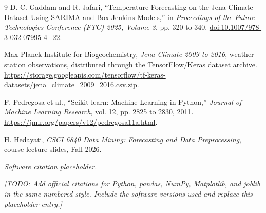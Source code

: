 \documentclass[11pt]{article}
\newcommand{\todo}[1]{\par\smallskip\noindent
  {\color{blue!60!black}\textit{[TODO: #1]}}\par\smallskip}
\begin{document}
\clearpage
\begin{thebibliography}{9}
D. C. Gaddam and R. Jafari,
``Temperature Forecasting on the Jena Climate Dataset Using SARIMA and
Box-Jenkins Models,'' in \textit{Proceedings of the Future Technologies
Conference (FTC) 2025, Volume 3}, pp. 320 to 340.
\href{https://doi.org/10.1007/978-3-032-07995-4_22}{doi:10.1007/978-3-032-07995-4\_22}.

Max Planck Institute for Biogeochemistry,
\textit{Jena Climate 2009 to 2016}, weather-station observations,
distributed through the TensorFlow/Keras dataset archive.
\url{https://storage.googleapis.com/tensorflow/tf-keras-datasets/jena_climate_2009_2016.csv.zip}.

F. Pedregosa et al., ``Scikit-learn: Machine Learning in Python,''
\textit{Journal of Machine Learning Research}, vol. 12,
pp. 2825 to 2830, 2011.
\url{https://jmlr.org/papers/v12/pedregosa11a.html}.

H. Hedayati, \textit{CSCI 6840 Data Mining: Forecasting and Data
Preprocessing}, course lecture slides, Fall 2026.

\textit{Software citation placeholder.}
\todo{Add official citations for Python, pandas, NumPy, Matplotlib, and
joblib in the same numbered style. Include the software versions used and replace this placeholder entry.}
\end{thebibliography}
\end{document}
